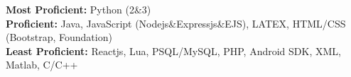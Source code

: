 

\begin{cvparagraph}

  \textbf{Most Proficient:} Python (2\&3)\\
  \textbf{Proficient:} Java, JavaScript (Nodejs\&Expressjs\&EJS), LATEX, HTML/CSS (Bootstrap, Foundation)\\
  \textbf{Least Proficient:} Reactjs, Lua, PSQL/MySQL, PHP, Android SDK, XML, Matlab, C/C++
\end{cvparagraph}

